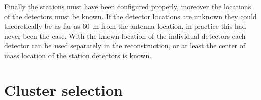 Finally the stations must have been configured properly, moreover the locations of the detectors must be known. If the detector locations are unknown they could theoretically be as far as \SI{60}{\meter} from the \gps antenna location, in practice this had never been the case. With the known location of the individual detectors each detector can be used separately in the reconstruction, or at least the center of mass location of the station detectors is known.


\section{Cluster selection}

